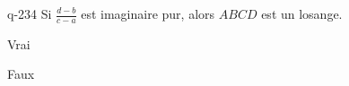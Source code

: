 \begin{truefalse}{q-234}
Si $\frac{d-b}{c-a}$ est imaginaire pur, alors $ABCD$ est un losange.
\item Vrai
\item* Faux
\end{truefalse}

